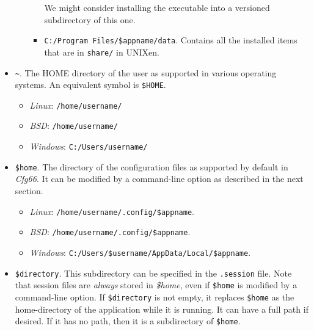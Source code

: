 \begin{itemize}
\begin{itemize}
\begin{itemize}
                     We might consider installing the executable into a
                     versioned subdirectory of this one.
                  \item \texttt{C:/Program Files/\$appname/data}. 
                     Contains all the installed items that are in
                     \texttt{share/} in UNIXen.
               \end{itemize}
         \end{itemize}
      \item \texttt{\textasciitilde}.
         The HOME directory of the user as supported in various operating
         systems.
         An equivalent symbol is \texttt{\$HOME}.
         \begin{itemize}
            \item \textsl{Linux}:
               \texttt{/home/username/}
            \item \textsl{BSD}:
               \texttt{/home/username/}
            \item \textsl{Windows}:
               \texttt{C:/Users/username/}
         \end{itemize}
      \item \texttt{\$home}.
         The directory of the configuration files as supported by default in
         \textsl{Cfg66}.
         It can be modified by a command-line option as described in the
         next section.
         \begin{itemize}
            \item \textsl{Linux}:
               \texttt{/home/username/.config/\$appname}.
            \item \textsl{BSD}:
               \texttt{/home/username/.config/\$appname}.
            \item \textsl{Windows}:
               \texttt{C:/Users/\$username/AppData/Local/\$appname}.
         \end{itemize}
      \item \texttt{\$directory}.
         This subdirectory can be specified in the \texttt{.session} file.
         Note that session files are \textsl{always} stored in
         \textsl{\$home}, even if \texttt{\$home} is modified by a
         command-line option.
         If \texttt{\$directory} is not empty,
         it replaces \texttt{\$home} as the home-directory of
         the application while it is running.
         It can have a full path if desired.
         If it has no path, then it is a subdirectory of \texttt{\$home}.
   \end{itemize}

